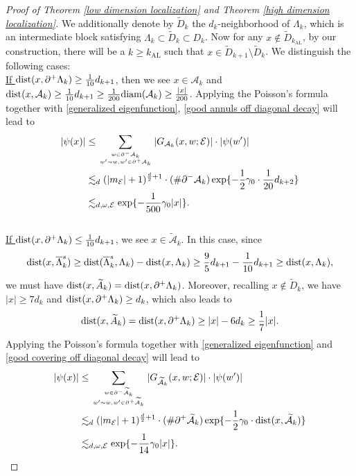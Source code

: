 \documentclass[11pt,reqno,UTF8,twoside]{amsart}
\newcommand{\barLambda}{\overline{\Lambda}}
\newcommand{\mcA}{\mathcal{A}}
\newcommand{\mcE}{\mathcal{E}}
\newcommand{\dist}{{\rm dist}}
\newcommand{\diam}{{\rm diam}}
\theoremstyle{definition}
\numberwithin{equation}{section}
\begin{document}
\begin{proof}[Proof of Theorem \ref{low dimension localization} and Theorem \ref{high dimension localization}]
We additionally denote by $\widetilde{D}_k$ the $d_k$-neighborhood of $\Lambda_k$, which is an intermediate block satisfying $\Lambda_{k}\subset \widetilde{D}_k\subset D_k$. Now for any $x\notin \widetilde{D}_{k_{\text{AL}}}$, by our construction,  there will be a $k\geq k_{\text{AL}}$ such that $x\in \widetilde{D}_{k+1}\setminus \widetilde{D}_k$. We distinguish the following cases: \\
\underline{If $\dist(x,\partial^+ \Lambda_k)\geq \frac{1}{10}d_{k+1}$}, then we see  $x\in \mcA_k$ and $\dist(x,\mcA_k)\geq \frac{1}{10}d_{k+1}\geq \frac{1}{200}\diam(\mcA_k)\geq \frac{|x|}{200}$. 
Applying the Poisson's formula  together with  \eqref{generalized eigenfunction},  \eqref{good annuls off diagonal decay} will lead to 
\begin{align}\label{exp decay 1}
  |\psi(x)| & \leq \sum_{w\in \partial^-\mcA_k \atop w'\sim w,w'\in \partial^+\mcA_k } |G_{\mcA_k}(x,w;\mcE)|\cdot |\psi(w')| \\
        \notag   & \lesssim_d (|m_{\mcE}|+1)^{\frac{d}{2}+1} \cdot (\# \partial^-\mcA_k) \exp\{-\frac{1}{2}\gamma_0 \cdot \frac{1}{20}d_{k+2}\} \\
  \notag         & \lesssim_{d,\omega,\mcE} \exp\{-\frac{1}{500}\gamma_0 |x|\}.
\end{align}\\
\underline{If $\dist(x,\partial^+\Lambda_k)\leq \frac{1}{10}d_{k+1}$}, we see  $x\in \widetilde{\mcA}_k$. In this case, since 
\[\dist(x,\barLambda_{k}^s)\geq \dist (\barLambda_k^s,\Lambda_k)-\dist(x,\Lambda_k)\geq \frac{9}{5}d_{k+1} -\frac{1}{10}d_{k+1} \geq \dist(x,\Lambda_k),\]
we must have $\dist(x,\widetilde{A}_k)=\dist(x,\partial^+\Lambda_k)$. Moreover, recalling  $x\notin \widetilde{D}_k$, we have $|x|\geq 7d_k$ and $\dist(x,\partial^+\Lambda_k)\geq d_k$, which also leads to 
\[\dist(x,\widetilde{A}_k)=\dist(x,\partial^+\Lambda_k)\geq |x|-6d_k\geq \frac{1}{7}|x|. \] 
Applying the Poisson's formula together with \eqref{generalized eigenfunction} and \eqref{good covering off diagonal decay}  will lead to 
\begin{align}\label{exp decay 2}
  |\psi(x)| & \leq \sum_{w\in \partial^-\widetilde{\mcA}_k \atop w'\sim w,w'\in \partial^+\widetilde{\mcA}_k } |G_{\widetilde{\mcA}_k}(x,w;\mcE)|\cdot |\psi(w')| \\
        \notag   & \lesssim_d (|m_{\mcE}|+1)^{\frac{d}{2}+1} \cdot (\# \partial^+\widetilde{\mcA}_k) \exp\{-\frac{1}{2}\gamma_0 \cdot \dist(x,\widetilde{\mcA}_k)\} \\
     \notag      & \lesssim_{d,\omega,\mcE} \exp\{-\frac{1}{14}\gamma_0 |x|\}.
\end{align}


\end{proof}
\end{document}
